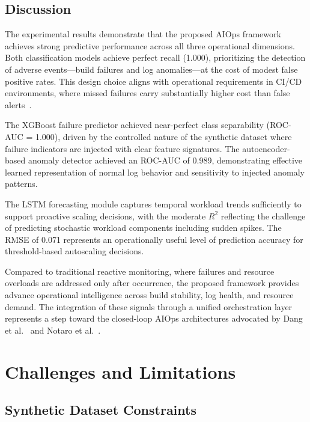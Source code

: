 \documentclass[conference]{IEEEtran}
\begin{document}
\subsection{Discussion}

The experimental results demonstrate that the proposed AIOps framework achieves strong predictive performance across all three operational dimensions. Both classification models achieve perfect recall (1.000), prioritizing the detection of adverse events---build failures and log anomalies---at the cost of modest false positive rates. This design choice aligns with operational requirements in CI/CD environments, where missed failures carry substantially higher cost than false alerts~\cite{dang2019aiops}.

The XGBoost failure predictor achieved near-perfect class separability (ROC-AUC = 1.000), driven by the controlled nature of the synthetic dataset where failure indicators are injected with clear feature signatures. The autoencoder-based anomaly detector achieved an ROC-AUC of 0.989, demonstrating effective learned representation of normal log behavior and sensitivity to injected anomaly patterns.

The LSTM forecasting module captures temporal workload trends sufficiently to support proactive scaling decisions, with the moderate $R^2$ reflecting the challenge of predicting stochastic workload components including sudden spikes. The RMSE of 0.071 represents an operationally useful level of prediction accuracy for threshold-based autoscaling decisions.

Compared to traditional reactive monitoring, where failures and resource overloads are addressed only after occurrence, the proposed framework provides advance operational intelligence across build stability, log health, and resource demand. The integration of these signals through a unified orchestration layer represents a step toward the closed-loop AIOps architectures advocated by Dang et al.~\cite{dang2019aiops} and Notaro et al.~\cite{notaro2021aiops}.

\section{Challenges and Limitations}

\subsection{Synthetic Dataset Constraints}
\end{document}
